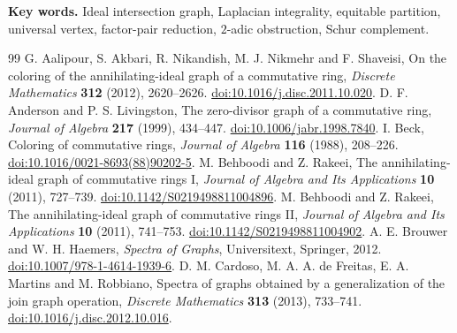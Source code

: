 \documentclass[11pt]{article}
\theoremstyle{remark}
\begin{document}
\noindent\textbf{Key words.} Ideal intersection graph, Laplacian integrality,
equitable partition, universal vertex, factor-pair reduction,
$2$-adic obstruction, Schur complement.





















\begingroup
\small
\begin{thebibliography}{99}
G. Aalipour, S. Akbari, R. Nikandish, M. J. Nikmehr and F. Shaveisi,
On the coloring of the annihilating-ideal graph of a commutative ring,
\emph{Discrete Mathematics} \textbf{312} (2012), 2620--2626.
\href{https://doi.org/10.1016/j.disc.2011.10.020}{doi:10.1016/j.disc.2011.10.020}.
D. F. Anderson and P. S. Livingston,
The zero-divisor graph of a commutative ring,
\emph{Journal of Algebra} \textbf{217} (1999), 434--447.
\href{https://doi.org/10.1006/jabr.1998.7840}{doi:10.1006/jabr.1998.7840}.
I. Beck, Coloring of commutative rings,
\emph{Journal of Algebra} \textbf{116} (1988), 208--226.
\href{https://doi.org/10.1016/0021-8693(88)90202-5}{doi:10.1016/0021-8693(88)90202-5}.
M. Behboodi and Z. Rakeei, The annihilating-ideal graph of commutative rings I,
\emph{Journal of Algebra and Its Applications} \textbf{10} (2011), 727--739.
\href{https://doi.org/10.1142/S0219498811004896}{doi:10.1142/S0219498811004896}.
M. Behboodi and Z. Rakeei, The annihilating-ideal graph of commutative rings II,
\emph{Journal of Algebra and Its Applications} \textbf{10} (2011), 741--753.
\href{https://doi.org/10.1142/S0219498811004902}{doi:10.1142/S0219498811004902}.
A. E. Brouwer and W. H. Haemers,
\emph{Spectra of Graphs}, Universitext, Springer, 2012.
\href{https://doi.org/10.1007/978-1-4614-1939-6}{doi:10.1007/978-1-4614-1939-6}.
D. M. Cardoso, M. A. A. de Freitas, E. A. Martins and M. Robbiano,
Spectra of graphs obtained by a generalization of the join graph operation,
\emph{Discrete Mathematics} \textbf{313} (2013), 733--741.
\href{https://doi.org/10.1016/j.disc.2012.10.016}{doi:10.1016/j.disc.2012.10.016}.

\end{thebibliography}
\end{document}
